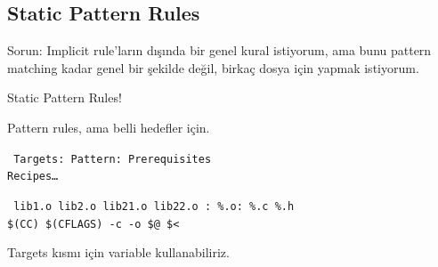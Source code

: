 \documentclass{beamer}
\begin{document}
\subsection{Static Pattern Rules}
\begin{frame}
    Sorun: Implicit rule'ların dışında bir genel kural istiyorum, ama bunu pattern matching kadar genel bir şekilde değil, birkaç dosya için yapmak istiyorum.
\end{frame}

\begin{frame}
    {Static Pattern Rules!}
    
    Pattern rules, ama belli hedefler için.\\
        \vspace{5mm}

    \texttt{%
        Targets: Pattern: Prerequisites\\
        \hspace{10mm} Recipes\ldots\\
        }
    
\end{frame}

\begin{frame}
    \texttt{%
        lib1.o lib2.o lib21.o lib22.o : \%.o: \%.c \%.h\\
        \hspace{10mm} \$(CC) \$(CFLAGS) -c -o \$@ \$<\\
    }

    \vspace{5mm}
    Targets kısmı için variable kullanabiliriz.

    
\end{frame}
\end{document}
